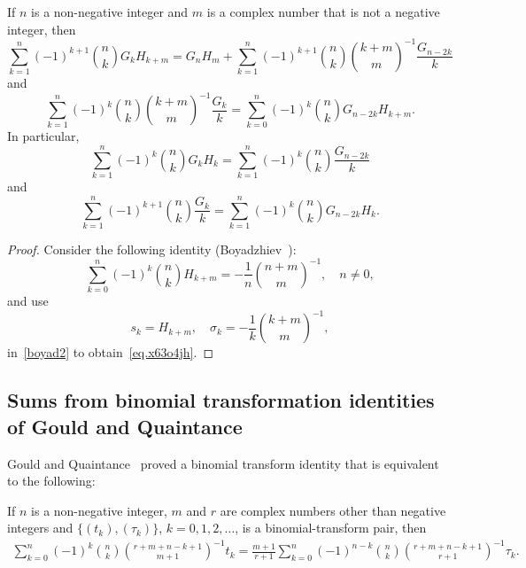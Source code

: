 \documentclass[12pt,reqno]{article}
\begin{document}
\begin{theorem}
If $n$ is a non-negative integer and $m$ is a complex number that is not a negative integer, then
\begin{equation}\label{eq.x63o4jh}
\sum_{k = 1}^n {( - 1)^{k + 1} \binom{{n}}{k}G_k H_{k + m} } = G_n H_m + \sum_{k = 1}^n {( - 1)^{k + 1} \binom{{n}}{k}\binom{{k + m}}{m}^{-1}\frac{{G_{n - 2k} }}{k}} 
\end{equation}
and
\begin{equation}
\sum_{k = 1}^n (- 1)^k \binom{{n}}{k}\binom{{k + m}}{m}^{ - 1} \frac{{G_k}}{k} = \sum_{k = 0}^n ( - 1)^k \binom{{n}}{k}G_{n - 2k} H_{k + m}.
\end{equation}
In particular,
\begin{equation}
\sum_{k = 1}^n ( - 1)^k \binom{{n}}{k} G_k H_k = \sum_{k = 1}^n {( - 1)^k \binom{{n}}{k}\frac{{G_{n - 2k} }}{k}} 
\end{equation}
and
\begin{equation}
\sum_{k = 1}^n ( - 1)^{k + 1} \binom{{n}}{k} \frac{{G_k }}{k} = \sum_{k = 1}^n {( - 1)^k \binom{{n}}{k}G_{n - 2k} H_k }.
\end{equation}
\end{theorem}
\begin{proof}
Consider the following identity (Boyadzhiev~\cite[Identity (9.37)]{boyadzhiev18}):
\begin{equation*}
\sum_{k = 0}^n {( - 1)^k \binom{{n}}{k}H_{k + m} } = - \frac{1}{n}\binom{{n + m}}{m}^{ - 1},\quad n\ne0,
\end{equation*}
and use
\begin{equation*}
s_k = H_{k + m} ,\quad \sigma_k = -\frac{{1 }}{{k }}\binom{{k + m}}{m}^{ - 1},  
\end{equation*}
in~\eqref{boyad2} to obtain~\eqref{eq.x63o4jh}.
\end{proof}
	
\subsection{Sums from binomial transformation identities of Gould and Quaintance}
	
Gould and Quaintance~\cite{gould14} proved a binomial transform identity that is equivalent to the following:
\begin{lemma}
If $n$ is a non-negative integer, $m$ and $r$ are complex numbers other than negative integers and $\{(t_k),(\tau_k)\}$, $k=0,1,2,\dots$, 
is a binomial-transform pair, then
\begin{align}\label{gouldqu}
\sum_{k = 0}^n {( - 1)^k \binom{{n}}{k}\binom{{r + m + n - k + 1}}{{m + 1}}^{-1}t_k } = \frac{{m + 1}}{{r + 1}}\sum_{k = 0}^n {( - 1)^{n - k} \binom{{n}}{k}\binom{{r + m + n - k + 1}}{{r + 1}}^{-1}\tau_k } .
\end{align}
\end{lemma}
	
\end{document}
